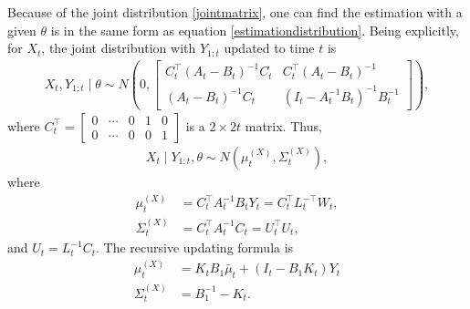 Because of the joint distribution \eqref{jointmatrix}, one can find the estimation with a given $\theta$ is in the same form as equation \eqref{estimationdistribution}. 
Being explicitly, for $X_{t}$, the joint distribution with $Y_{1:t}$ updated to time $t$ is 
\begin{align}
X_{t}, Y_{1:t} \mid \theta \sim N\left( 0, \begin{bmatrix}
C_{t}^\top\left(A_{t}-B_{t}\right) ^{-1}C_{t} & C_{t}^\top \left(A_{t}-B_{t}\right)^{-1}\\
\left(A_{t}-B_{t}\right)^{-1}C_{t} & \left(I_t- A_{t}^{-1}B_{t}\right) ^{-1}B_{t}^{-1}
\end{bmatrix} \right),
\end{align}
where $C_{t}^\top=\begin{bmatrix}
0 & \cdots & 0 & 1 & 0 \\ 0 & \cdots & 0 & 0 & 1 
\end{bmatrix}$ is a $2\times 2t$ matrix. Thus,
\begin{align}
X_{t}\mid Y_{1:t},\theta \sim N\left(\mu_{t}^{\left(X\right)},\Sigma_{t}^{\left(X\right)}\right),
\end{align}
where
\begin{align}
\mu_{t}^{\left(X\right)} & = C_{t}^\top A_t^{-1}B_tY_t =C_{t}^\top L_t^{-\top}W_t,\\
\Sigma_{t}^{\left(X\right)} & =C_{t}^\top A_t^{-1}C_{t} =U_{t}^\top U_{t},
\end{align}
and $U_{t} = L_t^{-1} C_{t}$.
The recursive updating formula is  
\begin{align}
\mu_{t}^{\left(X\right)}  &=  K_{t}B_1\bar{\mu}_{t} + \left(I_t- B_1K_{t}\right)Y_{t}  \\
\Sigma_{t}^{\left(X\right)}  &=B_1^{-1}-K_{t}.
\end{align}





